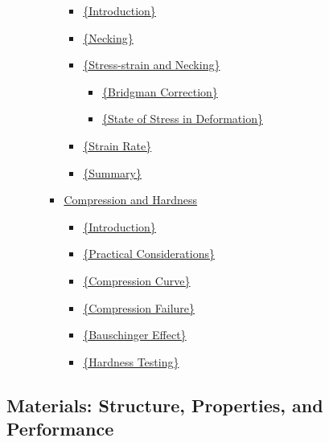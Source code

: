 \documentclass[
]{article}
\providecommand{\tightlist}{%
  \setlength{\itemsep}{0pt}\setlength{\parskip}{0pt}}
\begin{document}
\begin{itemize}
\begin{itemize}
\begin{itemize}
      \begin{itemize}
      \tightlist
      \item
        \protect\hyperlink{introduction-5}{\{Introduction\}}
      \item
        \protect\hyperlink{necking}{\{Necking\}}
      \item
        \protect\hyperlink{stress-strain-and-necking}{\{Stress-strain
        and Necking\}}

        \begin{itemize}
        \tightlist
        \item
          \protect\hyperlink{bridgman-correction}{\{Bridgman
          Correction\}}
        \item
          \protect\hyperlink{state-of-stress-in-deformation}{\{State of
          Stress in Deformation\}}
        \end{itemize}
      \item
        \protect\hyperlink{strain-rate}{\{Strain Rate\}}
      \item
        \protect\hyperlink{summary-4}{\{Summary\}}
      \end{itemize}
    \item
      \protect\hyperlink{compression-and-hardness}{Compression and
      Hardness}

      \begin{itemize}
      \tightlist
      \item
        \protect\hyperlink{introduction-6}{\{Introduction\}}
      \item
        \protect\hyperlink{practical-considerations}{\{Practical
        Considerations\}}
      \item
        \protect\hyperlink{compression-curve}{\{Compression Curve\}}
      \item
        \protect\hyperlink{compression-failure}{\{Compression Failure\}}
      \item
        \protect\hyperlink{bauschinger-effect}{\{Bauschinger Effect\}}
      \item
        \protect\hyperlink{hardness-testing}{\{Hardness Testing\}}
      \end{itemize}
    \end{itemize}
  \end{itemize}
\end{itemize}

\hypertarget{materials-structure-properties-and-performance}{%
\subsection{Materials: Structure, Properties, and
Performance}\label{materials-structure-properties-and-performance}}
\end{document}
